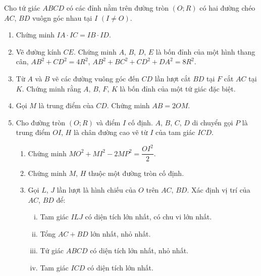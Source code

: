 \begin{bt}%
	Cho tứ giác $ABCD$ có các đỉnh nằm trên đường tròn $(O;R)$ có hai đường chéo $AC$, $BD$ vuôgn góc nhau tại $I$ $(I\ne O)$.
	\begin{enumerate}
		\item Chứng minh $IA\cdot IC=IB\cdot ID$.
		\item Vẽ đường kính $CE$. Chứng minh $A$, $B$, $D$, $E$ là bốn đỉnh của một hình thang cân, $AB^2+CD^2=4R^2$, $AB^2+ BC^2 +CD^2 +DA^2 =8R^2$.
		\item Từ $A$ và $B$ vẽ các đường vuông góc đến $CD$ lần lượt cắt $BD$ tại $F$ cắt $AC$ tại $K$. Chứng minh rằng $A$, $B$, $F$, $K$ là bốn đỉnh của một tứ giác đặc biệt.
		\item Gọi $M$ là trung điểm của $CD$. Chứng minh $AB=2OM$.
		\item Cho đường tròn $(O;R)$ và điểm $I$ cố định. $A$, $B$, $C$, $D$ di chuyển gọi $P$ là trung điểm $OI$, $H$ là chân đường cao vẽ từ $I$ của tam giác $ICD$.
		\begin{enumerate}[1.]
			\item Chứng minh $MO^2 +MI^2-2MP^2=\dfrac{OI^2}{2}$.
			\item Chứng minh $M$, $H$ thuộc một đường tròn cố định.
			\item Gọi $L$, $J$ lần lượt là hình chiếu của $O$ trên $AC$, $BD$. Xác định vị trí của $AC$, $BD$ để:
			\begin{enumerate}[i.]
				\item Tam giác $ILJ$ có diện tích lớn nhất, có chu vi lớn nhất.
				\item Tổng $AC+BD$ lớn nhất, nhỏ nhất.
				\item Tứ giác $ABCD$ có diện tích lớn nhất, nhỏ nhất.
				\item Tam giác $ICD$ có diện tích lớn nhất.
			\end{enumerate}
		\end{enumerate}
	\end{enumerate}
	
\end{bt}
